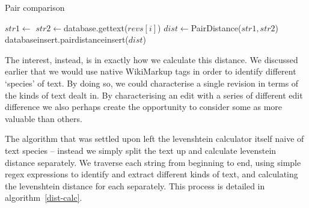 \begin{algorithm}
\caption{Pair comparison}\label{pair-comp}
  \begin{algorithmic}
    \State $str1 \gets $
    \State $str2 \gets $database.gettext($revs[i]$)
    \State $dist \gets $PairDistance($str1, str2$)
    \State databaseinsert.pairdistanceinsert($dist$)  
    \EndIf
    \EndFor
  \EndProcedure
  \end{algorithmic}
\end{algorithm}

The interest, instead, is in exactly how we calculate this
distance. We discussed earlier that we would use native WikiMarkup
tags in order to identify different `species' of text. By doing so, we
could characterise a single revision in terms of the kinds of text
dealt in. By characterising an edit with a series of different edit
difference we also perhaps create the opportunity to consider some as
more valuable than others.

The algorithm that was settled upon left the levenshtein calculator
itself naive of text species -- instead we simply split the text up
and calculate levenstein distance separately. We traverse each string
from beginning to end, using simple regex expressions to identify and
extract different kinds of text, and calculating the levenshtein
distance for each separately. This process is detailed in
algorithm~\ref{dist-calc}. 

